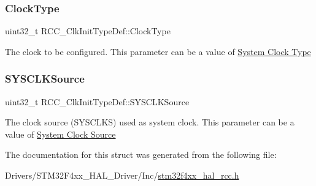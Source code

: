 \subsubsection{\texorpdfstring{Clock\+Type}{ClockType}}
{\footnotesize\ttfamily uint32\+\_\+t R\+C\+C\+\_\+\+Clk\+Init\+Type\+Def\+::\+Clock\+Type}

The clock to be configured. This parameter can be a value of \hyperlink{group___r_c_c___system___clock___type}{System Clock Type} \mbox{\label{struct_r_c_c___clk_init_type_def_a4ceff1fdbf423e347c63052ca2c1d7e1}} 
\subsubsection{\texorpdfstring{S\+Y\+S\+C\+L\+K\+Source}{SYSCLKSource}}
{\footnotesize\ttfamily uint32\+\_\+t R\+C\+C\+\_\+\+Clk\+Init\+Type\+Def\+::\+S\+Y\+S\+C\+L\+K\+Source}

The clock source (S\+Y\+S\+C\+L\+KS) used as system clock. This parameter can be a value of \hyperlink{group___r_c_c___system___clock___source}{System Clock Source} 

The documentation for this struct was generated from the following file\+:\begin{DoxyCompactItemize}
\item 
Drivers/\+S\+T\+M32\+F4xx\+\_\+\+H\+A\+L\+\_\+\+Driver/\+Inc/\hyperlink{stm32f4xx__hal__rcc_8h}{stm32f4xx\+\_\+hal\+\_\+rcc.\+h}\end{DoxyCompactItemize}
